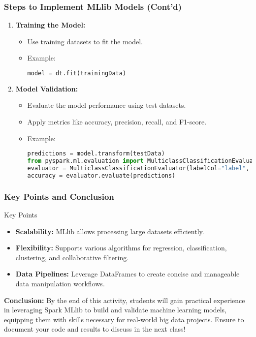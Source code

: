 \documentclass[aspectratio=169]{beamer}
\begin{document}
\begin{frame}[fragile]
    \frametitle{Steps to Implement MLlib Models (Cont'd)}
    \begin{enumerate}[resume]
        \item \textbf{Training the Model:}
        \begin{itemize}
            \item Use training datasets to fit the model.
            \item Example:
            \begin{lstlisting}[language=python]
model = dt.fit(trainingData)
            \end{lstlisting}
        \end{itemize}

        \item \textbf{Model Validation:}
        \begin{itemize}
            \item Evaluate the model performance using test datasets.
            \item Apply metrics like accuracy, precision, recall, and F1-score.
            \item Example:
            \begin{lstlisting}[language=python]
predictions = model.transform(testData)
from pyspark.ml.evaluation import MulticlassClassificationEvaluator
evaluator = MulticlassClassificationEvaluator(labelCol="label", predictionCol="prediction", metricName="accuracy")
accuracy = evaluator.evaluate(predictions)
            \end{lstlisting}
        \end{itemize}
    \end{enumerate}
\end{frame}

\begin{frame}
    \frametitle{Key Points and Conclusion}
    \begin{block}{Key Points}
        \begin{itemize}
            \item \textbf{Scalability:} MLlib allows processing large datasets efficiently.
            \item \textbf{Flexibility:} Supports various algorithms for regression, classification, clustering, and collaborative filtering.
            \item \textbf{Data Pipelines:} Leverage DataFrames to create concise and manageable data manipulation workflows.
        \end{itemize}
    \end{block}
    \textbf{Conclusion:} By the end of this activity, students will gain practical experience in leveraging Spark MLlib to build and validate machine learning models, equipping them with skills necessary for real-world big data projects. Ensure to document your code and results to discuss in the next class!
\end{frame}
\end{document}
